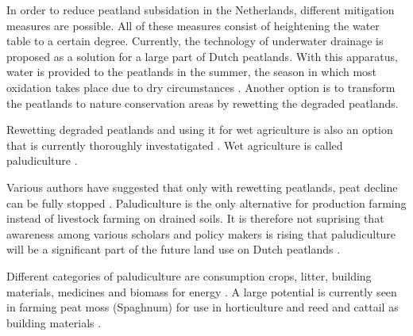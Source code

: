 \documentclass[12pt,a4paper,titlepage]{article}
\begin{document}
In order to reduce peatland subsidation in the Netherlands, different mitigation measures are possible. All of these measures consist of heightening the water table to a certain degree. Currently, the technology of underwater drainage is proposed as a solution for a large part of Dutch peatlands. With this apparatus, water is provided to the peatlands in the summer, the season in which most oxidation takes place due to dry circumstances \citep{van2011huidige}. Another option is to transform the peatlands to nature conservation areas by rewetting the degraded peatlands. 

Rewetting degraded peatlands and using it for wet agriculture is also an option that is currently thoroughly investatigated \citep{Wichmann20151063}. Wet agriculture is called paludiculture \citep{joosten2002wise}. 


Various authors have suggested that only with rewetting peatlands, peat decline can be fully stopped \citep{van2016dalende, wichtmann2016paludiculture}. Paludiculture is the only alternative for production farming instead of livestock farming on drained soils. It is therefore not suprising that awareness among various scholars and policy makers is rising that paludiculture will be a significant part of the future land use on Dutch peatlands \citep{abel2013database, wichtmann2016paludiculture, Wichmann20151063}. 

Different categories of paludiculture are consumption crops, litter, building materials, medicines and biomass for energy \citep{wichtmann2016paludiculture}. A large potential is currently seen in farming peat moss (Spaghnum) for use in horticulture and reed and cattail as building materials \citep{wichtmann2016paludiculture}.




\end{document}
